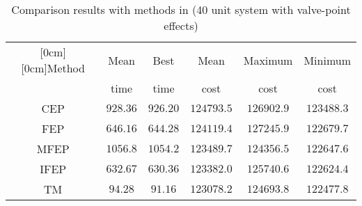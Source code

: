 \begin{table}[h]
\caption{Comparison results  with methods in \cite{cit:mic77} 
(40 unit system with valve-point effects)}
\begin{center}
\begin{tabular}{|c|c|c|c|c|c|}
\hline
\multicolumn{1}{|c|}{\raisebox{-1.50ex}[0cm][0cm]{\!Method\!}}
& \multicolumn{1}{|c|}{Mean}%
& \multicolumn{1}{|c|}{Best}%
& \multicolumn{1}{|c|}{Mean}%
& \multicolumn{1}{|c|}{Maximum}%
& \multicolumn{1}{|c|}{Minimum} \\%
& time&time& cost&cost&cost\\ \hline
 CEP   &  $928.36$  &  $926.20$  &  $124793.5$ & $126902.9$ & $123488.3$ \\ \hline
 FEP   &  $646.16$  &  $644.28$  &  $124119.4$ & $127245.9$ & $122679.7$ \\ \hline
 MFEP  &  $1056.8$  &  $1054.2$  &  $123489.7$ & $124356.5$ & $122647.6$ \\ \hline
 IFEP  &  $632.67$  &  $630.36$  &  $123382.0$ & $125740.6$ & $122624.4$ \\ \hline
 TM    &  $94.28$  &  $91.16$  &  $123078.2$ & $124693.8$ & $122477.8$ \\ \hline
\end{tabular}
\label{tab-liu2}
\end{center}
\end{table}
